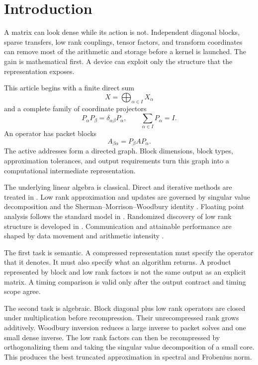 \section{Introduction}\label{main:section:001}\label{sec:introduction}

A matrix can look dense while its action is not. Independent diagonal blocks, sparse transfers, low rank couplings, tensor factors, and transform coordinates can remove most of the arithmetic and storage before a kernel is launched. The gain is mathematical first. A device can exploit only the structure that the representation exposes.

This article begins with a finite direct sum
\[
X=\bigoplus_{\alpha\in I}X_\alpha
\]
and a complete family of coordinate projectors
\[
P_\alpha P_\beta=\delta_{\alpha\beta}P_\alpha,
\qquad
\sum_{\alpha\in I}P_\alpha=I.
\]
An operator has packet blocks
\[
A_{\beta\alpha}=P_\beta AP_\alpha.
\]
The active addresses form a directed graph. Block dimensions, block types, approximation tolerances, and output requirements turn this graph into a computational intermediate representation.

The underlying linear algebra is classical. Direct and iterative methods are treated in \cite{GolubVanLoan2013,Saad2003,Davis2006}. Low rank approximation and updates are governed by singular value decomposition and the Sherman--Morrison--Woodbury identity \cite{EckartYoung1936,Mirsky1960,Hager1989,BunchNielsen1978}. Floating point analysis follows the standard model in \cite{Higham2002,IEEE7542019}. Randomized discovery of low rank structure is developed in \cite{HalkoMartinssonTropp2011,MartinssonTropp2020}. Communication and attainable performance are shaped by data movement and arithmetic intensity \cite{HongKung1981,WilliamsWatermanPatterson2009,BallardDemmelHoltzSchwartz2011,FrigoLeisersonProkopRamachandran1999}.

The first task is semantic. A compressed representation must specify the operator that it denotes. It must also specify what an algorithm returns. A product represented by block and low rank factors is not the same output as an explicit matrix. A timing comparison is valid only after the output contract and timing scope agree.

The second task is algebraic. Block diagonal plus low rank operators are closed under multiplication before recompression. Their unrecompressed rank grows additively. Woodbury inversion reduces a large inverse to packet solves and one small dense inverse. The low rank factors can then be recompressed by orthogonalizing them and taking the singular value decomposition of a small core. This produces the best truncated approximation in spectral and Frobenius norm.

